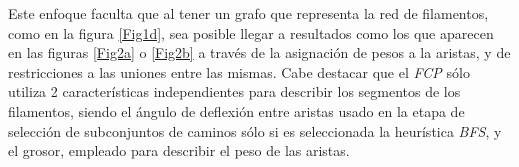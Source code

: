     
Este enfoque faculta que al tener un grafo que representa la red de filamentos, como en la figura \ref{Fig1d}, sea posible llegar a resultados como los que aparecen en las figuras \ref{Fig2a} o \ref{Fig2b} a trav\'es de la asignaci\'on de pesos a la aristas, y de restricciones a las uniones entre las mismas. Cabe destacar que el {\it FCP} s\'olo utiliza 2 caracter\'isticas independientes para describir los segmentos de los filamentos, siendo el \'angulo de deflexi\'on entre aristas usado en la etapa de selecci\'on de subconjuntos de caminos s\'olo si es seleccionada la heur\'istica {\it BFS}, y el grosor, empleado para describir el peso de las aristas.  

